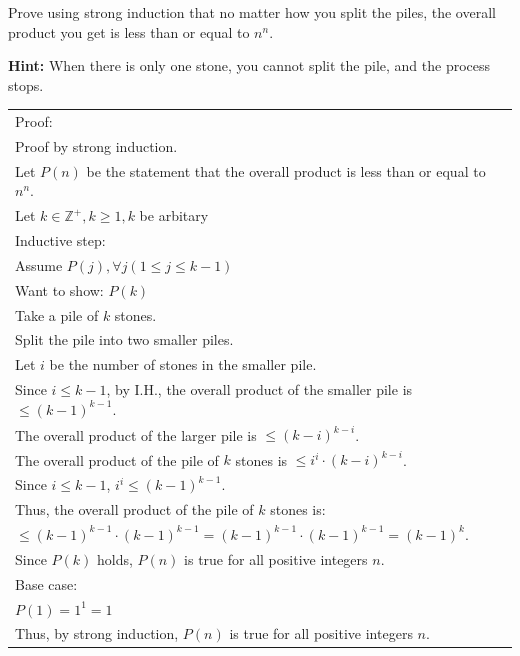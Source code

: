 \documentclass[12pt]{exam}
\begin{document}
Prove using strong induction that no matter how you split the piles, the overall product you get is less than or equal to $n^ n$.

\textbf{Hint:} When there is only one stone, you cannot split the pile, and the process stops.

\begin{solution}

	\begin{tabular}{ll}
		Proof:                                                                                   \\
		Proof by strong induction.                                                               \\
		Let $P(n)$ be the statement that the overall product is less than or equal to $n^n$.     \\
		Let $k\in \mathbb{Z}^+, k\ge 1, k$ be arbitary                                           \\
		Inductive step:                                                                          \\
		Assume $P(j), \forall j(1\le j\le k-1)$                                                  \\
		Want to show: $P(k)$                                                                     \\
		Take a pile of $k$ stones.                                                               \\
		Split the pile into two smaller piles.                                                   \\
		Let $i$ be the number of stones in the smaller pile.                                     \\
		Since $i\le k-1$, by I.H., the overall product of the smaller pile is $\le (k-1)^{k-1}$. \\
		The overall product of the larger pile is $\le (k-i)^{k-i}$.                             \\
		The overall product of the pile of $k$ stones is $\le i^{i}\cdot (k-i)^{k-i}$.           \\
		Since $i\le k-1$, $i^{i}\le (k-1)^{k-1}$.                                                \\
		Thus, the overall product of the pile of $k$ stones is:                                  \\
		$\le (k-1)^{k-1}\cdot (k-1)^{k-1}=(k-1)^{k-1}\cdot (k-1)^{k-1}=(k-1)^{k}$.               \\
		Since $P(k)$ holds, $P(n)$ is true for all positive integers $n$.                        \\
		Base case:                                                                               \\
		$P(1)=1^1=1$                                                                             \\
		Thus, by strong induction, $P(n)$ is true for all positive integers $n$.
	\end{tabular}
\end{solution}
\end{document}
